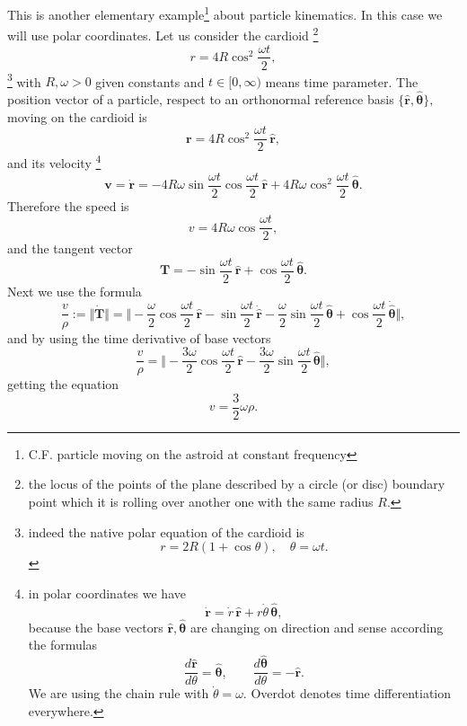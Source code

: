 \documentclass[12pt]{article}
\begin{document}
This is another elementary example{\footnote{C.F. particle moving on the astroid at constant frequency}} about particle kinematics. In this case we will use polar coordinates. Let us consider the cardioid {\footnote{the locus of the points of the plane described by a circle (or disc) boundary point which it  is rolling over another one with the same radius $R$.}}
$$r=4R\cos^2\frac{\omega t}{2},$$ 
{\footnote{indeed the native polar equation of the cardioid is
$$r=2R(1+\cos\theta), \quad \theta=\omega t.$$ }}
with $R,\omega>0$ given constants and $t\in [0,\infty)$ means time parameter. The position vector of a particle, respect to an orthonormal reference basis $\{\mathbf{\hat{r}},\mathbf{\hat{\theta}}\},$ moving on the cardioid is
$$\mathbf{r}=4R\cos^2\frac{\omega t}{2}\,\mathbf{\hat{r}},$$
and its velocity {\footnote{in polar coordinates we have
$$\mathbf{\dot{r}}=\dot{r}\,\mathbf{\hat{r}}+r\dot{\theta}\, \mathbf{\hat{\theta}},$$
because the base vectors $\mathbf{\hat{r}}, \mathbf{\hat{\theta}}$ are changing on direction and sense according the formulas 
$$\frac{d\mathbf{\hat{r}}}{d\theta}=\mathbf{\hat{\theta}}, \qquad 
\frac{d\mathbf{\hat{\theta}}}{d\theta}=-\mathbf{\hat{r}}.$$
We are using the chain rule with $\dot{\theta}=\omega.$ Overdot denotes time differentiation everywhere.}}
$$\mathbf{v}=\mathbf{\dot{r}}=-4R\omega\sin\frac{\omega t}{2}\cos\frac{\omega t}{2}\,\mathbf{\hat{r}}+
4R\omega\cos^2\frac{\omega t}{2}\,\mathbf{\hat{\theta}}.$$
Therefore the speed is
$$v=4R\omega\cos\frac{\omega t}{2},$$
and the tangent vector
$$\mathbf{T}=-\sin\frac{\omega t}{2}\,\mathbf{\hat{r}}+\cos\frac{\omega t}{2}\,\mathbf{\hat{\theta}}.$$
Next we use the formula
$$\frac{v}{\rho}:=\big\Vert\mathbf{\dot{T}}\big\Vert=
\bigg\Vert -\frac{\omega}{2}\cos\frac{\omega t}{2}\,\mathbf{\hat{r}}
-\sin\frac{\omega t}{2}\,\mathbf{\dot{\hat{r}}}-
\frac{\omega}{2}\sin\frac{\omega t}{2}\,\mathbf{\hat{\theta}}+
\cos\frac{\omega t}{2}\,\mathbf{\dot{\hat{\theta}}}\bigg\Vert,$$
and by using the time derivative of base vectors
$$\frac{v}{\rho}=\bigg\Vert -\frac{3\omega}{2}\cos\frac{\omega t}{2}\,\mathbf{\hat{r}}-
\frac{3\omega}{2}\sin\frac{\omega t}{2}\,\mathbf{\hat{\theta}}\bigg\Vert,$$
getting the equation
$$v=\frac{3}{2}\omega\rho.$$



\end{document}
